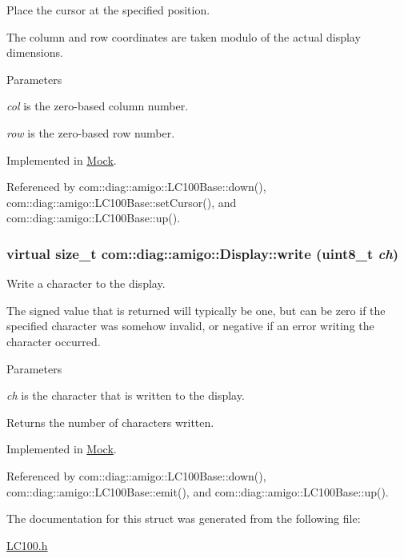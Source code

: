 Place the cursor at the specified position. 

The column and row coordinates are taken modulo of the actual display dimensions. 
\begin{DoxyParams}{Parameters}
\item[{\em col}]is the zero-\/based column number. \item[{\em row}]is the zero-\/based row number. \end{DoxyParams}


Implemented in \hyperlink{classMock_a5545e824f824b147221b61355cabbd5b}{Mock}.



Referenced by com::diag::amigo::LC100Base::down(), com::diag::amigo::LC100Base::setCursor(), and com::diag::amigo::LC100Base::up().

\hypertarget{structcom_1_1diag_1_1amigo_1_1Display_a4fa3864436e551a42135fbbd3bcb1a3f}{
\subsubsection[{write}]{\setlength{\rightskip}{0pt plus 5cm}virtual size\_\-t com::diag::amigo::Display::write (uint8\_\-t {\em ch})}}
\label{structcom_1_1diag_1_1amigo_1_1Display_a4fa3864436e551a42135fbbd3bcb1a3f}


Write a character to the display. 

The signed value that is returned will typically be one, but can be zero if the specified character was somehow invalid, or negative if an error writing the character occurred. 
\begin{DoxyParams}{Parameters}
\item[{\em ch}]is the character that is written to the display. \end{DoxyParams}
\begin{DoxyReturn}{Returns}
the number of characters written. 
\end{DoxyReturn}


Implemented in \hyperlink{classMock_ac3d7b857783204d996cd3e0a147a4ac5}{Mock}.



Referenced by com::diag::amigo::LC100Base::down(), com::diag::amigo::LC100Base::emit(), and com::diag::amigo::LC100Base::up().



The documentation for this struct was generated from the following file:\begin{DoxyCompactItemize}
\item 
\hyperlink{LC100_8h}{LC100.h}\end{DoxyCompactItemize}
